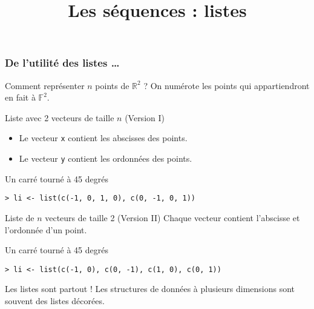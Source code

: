 \documentclass[10pt]{beamer}
\title{Les séquences : listes}
\begin{document}
\maketitle



\begin{frame}[fragile]
  \frametitle{De l’utilité des listes \dots}

  \begin{exampleblock}{Comment représenter $n$ points de $\mathbb{R}^2$ ?}
    On numérote les points qui appartiendront en fait à $\mathbb{F}^2$.
  \end{exampleblock}

 \begin{block}{Liste avec 2 vecteurs de taille $n$ (Version I)}
      \begin{itemize}
      \item Le vecteur \texttt{x} contient les abscisses des points.
      \item Le vecteur \texttt{y} contient les ordonnées des points.
      \end{itemize}
 \end{block}

  \begin{exampleblock}{Un carré tourné à 45 degrés}
   \begin{lstlisting}[style=block]
> li <- list(c(-1, 0, 1, 0), c(0, -1, 0, 1))
   \end{lstlisting}
 \end{exampleblock}

 \begin{block}{Liste de $n$ vecteurs de taille 2 (Version II)}
   Chaque vecteur contient l'abscisse et l'ordonnée d'un point.
 \end{block}

  \begin{exampleblock}{Un carré tourné à 45 degrés}
   \begin{lstlisting}[style=block]
> li <- list(c(-1, 0), c(0, -1), c(1, 0), c(0, 1))
   \end{lstlisting}
 \end{exampleblock}



  \begin{alertblock}{Les listes sont partout !}
    Les structures de données à plusieurs dimensions sont souvent des listes décorées.
  \end{alertblock}

\end{frame}
\end{document}
